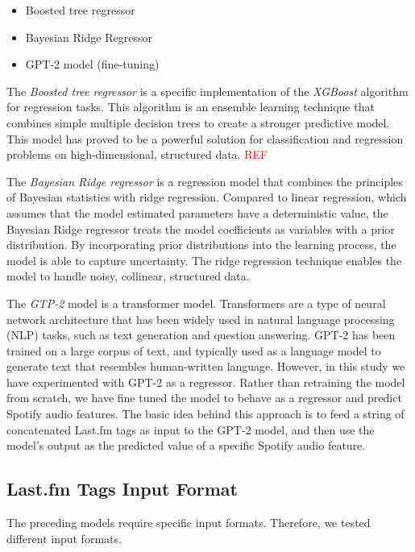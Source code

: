 \documentclass[sn-mathphys]{sn-jnl}%
\theoremstyle{thmstyleone}%
\theoremstyle{thmstyletwo}%
\theoremstyle{thmstylethree}%
\begin{document}
\begin{itemize}
      \item Boosted tree regressor \cite{xgboost}
      \item Bayesian Ridge Regressor \cite{bayesian}
      \item GPT-2 model (fine-tuning) \cite{radford2019language}
\end{itemize}


The \emph{Boosted tree regressor} is a specific implementation of the \emph{XGBoost} algorithm for regression tasks.
This algorithm is an ensemble learning technique that combines simple multiple decision trees to
create a stronger predictive model.
This model has proved to be a powerful solution for classification and regression problems on high-dimensional, structured data.
\textcolor{red}{REF}

The \emph{Bayesian Ridge regressor} is a regression model that combines the principles of Bayesian statistics with ridge regression.
Compared to linear regression, which assumes that the model estimated parameters have a deterministic value, the Bayesian Ridge regressor treats the model coefficients as variables with a prior distribution.
By incorporating prior distributions into the learning process, the model is able to capture uncertainty.
The ridge regression technique enables the model to handle noisy, collinear, structured data.

The \emph{GTP-2} model is a transformer model.
Transformers are a type of neural network architecture that has been widely used in natural language processing (NLP) tasks,
such as text generation and question answering.
GPT-2 has been trained on a large corpus of text, and typically used as a language model to generate text that resembles human-written language.
However, in this study we have experimented with GPT-2 as a regressor.
Rather than retraining the model from scratch, we have fine tuned the model to behave as a regressor and  predict Spotify audio features.
The basic idea behind this approach is to feed a string of concatenated Last.fm tags as input to the GPT-2 model, and then use the model's output as the predicted value of a specific Spotify audio feature.


\subsection{Last.fm Tags Input Format}

The preceding models require specific input formats.
Therefore, we tested different input formats.
\end{document}
